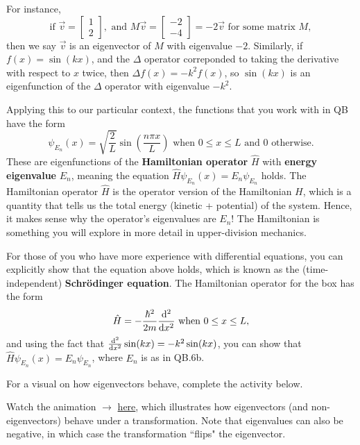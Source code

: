 \documentclass{article}
\begin{document}
\begin{tcolorbox}[arc=2mm, colback=white]
    For instance, 
    \[
    \text{if }\vec{v} = \begin{bmatrix}
        1 \\ 2
    \end{bmatrix},
    \text{ and } M\vec{v} = \begin{bmatrix}
        -2 \\ -4
    \end{bmatrix} = -2\vec{v} \text{ for some matrix }M,
    \]
    then we say $\vec{v}$ is an eigenvector of $M$ with eigenvalue $-2$. Similarly, if $f(x)=\sin(kx)$, and the $\Delta$ operator correponded to taking the derivative with respect to $x$ twice, then $\Delta f(x) = -k^2 f(x)$, so $\sin(kx)$ is an eigenfunction of the $\Delta$ operator with eigenvalue $-k^2$.

    \vspace{1em}

    Applying this to our particular context, the functions that you work with in QB have the form 
    \[
    \psi_{E_n} (x) = \sqrt{\frac{2}{L}} \sin\left(\frac{n\pi x}{L}\right) \text{ when }0\le x \le L \text{ and } 0 \text{ otherwise}.
    \]
    These are eigenfunctions of the \textbf{Hamiltonian operator} $\hat{H}$ with \textbf{energy eigenvalue} $E_n$, meaning the equation $\hat{H}\psi_{E_n}(x) = E_n \psi_{E_n}$ holds. The Hamiltonian operator $\hat{H}$ is the operator version of the Hamiltonian $H$, which is a quantity that tells us the total energy (kinetic + potential) of the system. Hence, it makes sense why the operator's eigenvalues are $E_n$! The Hamiltonian is something you will explore in more detail in upper-division mechanics.
    \begin{tcolorbox}[arc=2mm, colback=magenta!15!white, colframe=magenta!80!black, title=\textsc{More on the Hamiltonian Operator (Enrichment)}]
        For those of you who have more experience with differential equations, you can explicitly show that the equation above holds, which is known as the (time-independent) \textbf{Schrödinger equation}. The Hamiltonian operator for the box has the form
        \[
        \hat{H} = -\frac{\hbar^2}{2m} \dv[2]{x} \text{ when }0\le x \le L,
        \]
        and using the fact that $\dv[2]{x} \sin(kx) = -k^2 \sin(kx)$, you can show that $\hat{H}\psi_{E_n}(x) = E_n \psi_{E_n}$, where $E_n$ is as in QB.6b.
    \end{tcolorbox}
    For a visual on how eigenvectors behave, complete the activity below.
    \begin{tcolorbox}[arc=2mm, colback=red!10!white, colframe=red!50!black, title=\textbf{ACTIVITY}]
                Watch the animation $\rightarrow$ \textcolor{red}{\href{https://youtu.be/Lh_dd04MtTY}{here}}, which illustrates how eigenvectors (and non-eigenvectors) behave under a transformation. Note that eigenvalues can also be negative, in which case the transformation ``flips" the eigenvector.
            \end{tcolorbox}
\end{tcolorbox}
\end{document}
